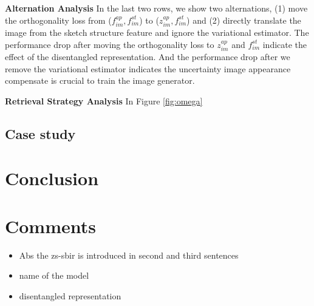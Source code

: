 \documentclass[10pt,twocolumn,letterpaper]{article}
\begin{document}
\noindent\textbf{Alternation Analysis}
In the last two rows, we show two alternations, (1) move the orthogonality loss from ($f_{im}^{ap},f_{im}^{st}$) to ($z_{im}^{ap},f_{im}^{st}$) and (2) directly translate the image from the sketch structure feature and ignore the variational estimator. The performance drop after moving the orthogonality loss to $z_{im}^{ap}$ and $f_{im}^{st}$ indicate the effect of the disentangled representation. And the performance drop after we remove the variational estimator indicates the uncertainty image appearance compensate is crucial to train the image generator.

\noindent\textbf{Retrieval Strategy  Analysis}
In Figure \ref{fig:omega}

\subsection{Case study}

\section{Conclusion}

\section{Comments}
\begin{itemize}
	\item Abs the zs-sbir is introduced in second and third sentences
	\item name of the model
	\item disentangled representation
\end{itemize}


{\small


}
\end{document}
